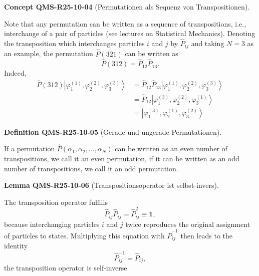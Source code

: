 \documentclass[10pt, letterpaper]{article}
\newcommand{\CustomHeading}[3]{%
  \par\medskip\noindent%
  \textbf{#1 #2} \textnormal{(#3)}.\enskip%
}
\newenvironment{DEF}[2]{\begin{unitbox}\CustomHeading{Definition}{#1}{#2}}{\end{unitbox}}
\newenvironment{LEM}[2]{\begin{unitbox}\CustomHeading{Lemma}{#1}{#2}}{\end{unitbox}}
\newenvironment{CONC}[2]{\begin{unitbox}\CustomHeading{Concept}{#1}{#2}}{\end{unitbox}}
\begin{document}
\begin{CONC}{QMS-R25-10-04}{Permutationen als Sequenz von Transpositionen}
Note that any permutation can be written as a sequence of transpositions, i.e., interchange of a pair of particles (see lectures on Statistical Mechanics). Denoting the transposition which interchanges particles $i$ and $j$ by $\hat{P}_{i j}$ and taking $N=3$ as an example, the permutation $\hat{P}(321)$ can be written as
$$
\hat{P}(312)=\hat{P}_{12} \hat{P}_{13} .
$$
Indeed,
$$
\begin{aligned}
\hat{P}(312)\left|\varphi_{1}^{(1)}, \varphi_{2}^{(2)}, \varphi_{3}^{(3)}\right\rangle & =\hat{P}_{12} \hat{P}_{13}\left|\varphi_{1}^{(1)}, \varphi_{2}^{(2)}, \varphi_{3}^{(3)}\right\rangle \\
& =\hat{P}_{12}\left|\varphi_{1}^{(3)}, \varphi_{2}^{(2)}, \varphi_{3}^{(1)}\right\rangle \\
& =\left|\varphi_{1}^{(3)}, \varphi_{2}^{(1)}, \varphi_{3}^{(2)}\right\rangle
\end{aligned}
$$
\end{CONC}

\begin{DEF}{QMS-R25-10-05}{Gerade und ungerade Permutationen}
If a permutation $\hat{P}\left(\alpha_{1}, \alpha_{2}, \ldots, \alpha_{N}\right)$ can be written as an even number of transpositions, we call it an even permutation, if it can be written as an odd number of transpositions, we call it an odd permutation.
\end{DEF}

\begin{LEM}{QMS-R25-10-06}{Transpositionsoperator ist selbst-invers}
The transposition operator fulfills
$$
\hat{P}_{i j} \hat{P}_{i j}=\hat{P}_{i j}^{2} \equiv \mathbf{1},
$$
because interchanging particles $i$ and $j$ twice reproduces the original assignment of particles to states. Multiplying this equation with $\hat{P}_{i j}^{-1}$ then leads to the identity
$$
\hat{P}_{i j}^{-1}=\hat{P}_{i j},
$$
the transposition operator is self-inverse.
\end{LEM}
\end{document}
